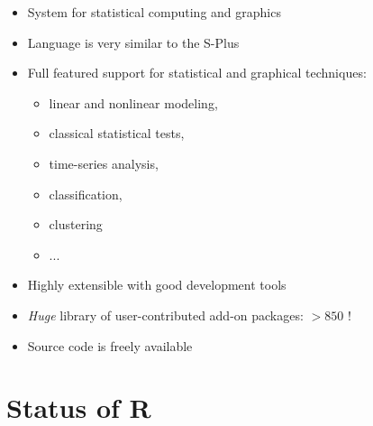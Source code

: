 \documentclass{asaproc}
\begin{document}
  \begin{itemize}

    \item System for statistical computing and graphics

    \item Language is very similar to the S-Plus
      
    \item Full featured support for statistical and graphical techniques:

      \begin{itemize}
      \item linear and nonlinear modeling,
      \item classical statistical tests,
      \item time-series analysis,
      \item classification,
      \item clustering
      \item ...
      \end{itemize}

    \item Highly extensible with good development tools
      
    \item \emph{Huge} library of user-contributed add-on packages: $>850$ ! 
      
    \item Source code is freely available

\end{itemize}

\section{Status of \textsc{R}}
\end{document}
